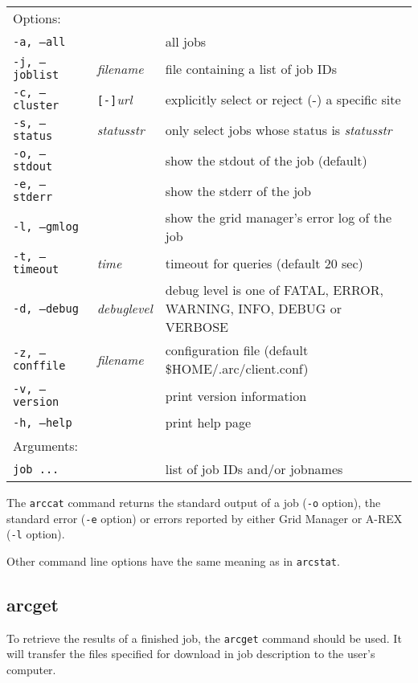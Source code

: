 \hspace*{0.5cm}
\begin{shaded}
\end{shaded}
\begin{longtable}{llp{8cm}}
   Options:&&\\
   \texttt{-a, --all}& & all jobs\\
   \texttt{-j, --joblist}& \textit{filename} & file containing a list of job IDs\\
   \texttt{-c, --cluster}&\verb#[-]#\textit{url}&explicitly select or reject (-) a specific site\\
   \texttt{-s, --status}& \textit{statusstr} &only select jobs whose status is \textit{statusstr}\\
   \texttt{-o, --stdout}& & show the stdout of the job (default)\\
   \texttt{-e, --stderr}& & show the stderr of the job\\
   \texttt{-l, --gmlog}& & show the grid manager's error log of the job\\
   \texttt{-t, --timeout}& \textit{time} & timeout for queries (default 20 sec)\\
   \texttt{-d, --debug}& \textit{debuglevel}&debug level is one of  FATAL, ERROR, WARNING, INFO, DEBUG or VERBOSE\\
   \texttt{-z, --conffile}&\textit{filename}& configuration file (default {\$}HOME/.arc/client.conf)\\
   \texttt{-v, --version}& & print version information\\
   \texttt{-h, --help}& & print help page\\
   Arguments:&&\\
   \texttt{job ...} && list of job IDs and/or jobnames\\
\end{longtable}

The \texttt{arccat} command returns the standard output of a job
(\texttt{-o} option), the standard error (\texttt{-e} option) or
errors reported by either Grid Manager or A-REX (\texttt{-l} option).

Other command line options have the same meaning as in \verb#arcstat#.


\subsection{arcget}
\label{sec:arcget}

To retrieve the results of a finished job, the \texttt{arcget}
 command should be used. It
will transfer the files specified for download in job description
to the user's computer.

